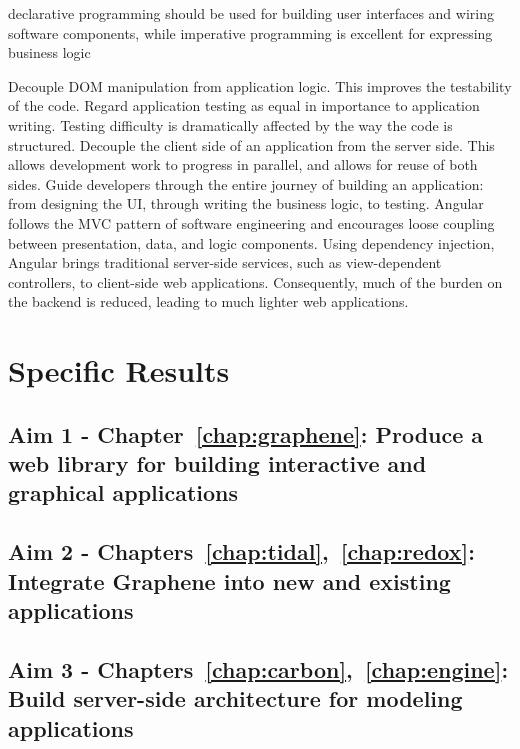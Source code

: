 declarative programming should be used for building user interfaces and wiring software components, while imperative programming is excellent for expressing business logic


Decouple DOM manipulation from application logic. This improves the testability of the code. Regard application testing as equal in importance to application writing. Testing difficulty is dramatically affected by the way the code is structured.
Decouple the client side of an application from the server side. This allows development work to progress in parallel, and allows for reuse of both sides.
Guide developers through the entire journey of building an application: from designing the UI, through writing the business logic, to testing.
Angular follows the MVC pattern of software engineering and encourages loose coupling between presentation, data, and logic components. Using dependency injection, Angular brings traditional server-side services, such as view-dependent controllers, to client-side web applications. Consequently, much of the burden on the backend is reduced, leading to much lighter web applications.


\section{Specific Results}
\subsection{Aim 1 - Chapter~\ref{chap:graphene}: Produce a web library for building interactive and graphical applications}
\subsection{Aim 2 - Chapters~\ref{chap:tidal},~\ref{chap:redox}: Integrate Graphene into new and existing applications}
\subsection{Aim 3 - Chapters~\ref{chap:carbon},~\ref{chap:engine}: Build server-side architecture for modeling applications}


